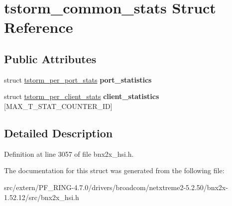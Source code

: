 \hypertarget{structtstorm__common__stats}{
\section{tstorm\_\-common\_\-stats Struct Reference}
\label{structtstorm__common__stats}
}
\subsection*{Public Attributes}
\begin{DoxyCompactItemize}
\item 
\hypertarget{structtstorm__common__stats_a1251f4f55f1fe8a8b32be1ca36bfa644}{
struct \hyperlink{structtstorm__per__port__stats}{tstorm\_\-per\_\-port\_\-stats} {\bfseries port\_\-statistics}}
\label{structtstorm__common__stats_a1251f4f55f1fe8a8b32be1ca36bfa644}

\item 
\hypertarget{structtstorm__common__stats_adaf2cc6f82ca1c4f9819861c16efe892}{
struct \hyperlink{structtstorm__per__client__stats}{tstorm\_\-per\_\-client\_\-stats} {\bfseries client\_\-statistics} \mbox{[}MAX\_\-T\_\-STAT\_\-COUNTER\_\-ID\mbox{]}}
\label{structtstorm__common__stats_adaf2cc6f82ca1c4f9819861c16efe892}

\end{DoxyCompactItemize}


\subsection{Detailed Description}


Definition at line 3057 of file bnx2x\_\-hsi.h.



The documentation for this struct was generated from the following file:\begin{DoxyCompactItemize}
\item 
src/extern/PF\_\-RING-\/4.7.0/drivers/broadcom/netxtreme2-\/5.2.50/bnx2x-\/1.52.12/src/bnx2x\_\-hsi.h\end{DoxyCompactItemize}
